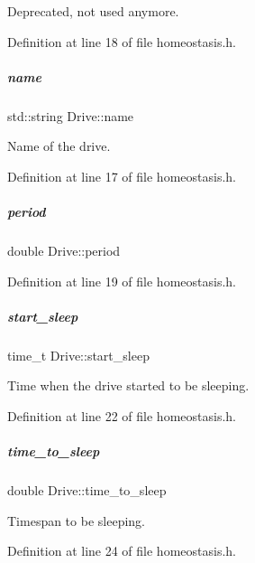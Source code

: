 Deprecated, not used anymore. 



Definition at line 18 of file homeostasis.\+h.

\mbox{\label{group__homeostasis_aacb834e6317eab8a360eeaa10286431d}} 
\subparagraph{\texorpdfstring{name}{name}}
{\footnotesize\ttfamily std\+::string Drive\+::name}



Name of the drive. 



Definition at line 17 of file homeostasis.\+h.

\mbox{\label{group__homeostasis_a371c5d5dac25ea418cb1031b9f4551f3}} 
\subparagraph{\texorpdfstring{period}{period}}
{\footnotesize\ttfamily double Drive\+::period}



Definition at line 19 of file homeostasis.\+h.

\mbox{\label{group__homeostasis_adec23d880897e719e701d6f8a554a88b}} 
\subparagraph{\texorpdfstring{start\+\_\+sleep}{start\_sleep}}
{\footnotesize\ttfamily time\+\_\+t Drive\+::start\+\_\+sleep}



Time when the drive started to be sleeping. 



Definition at line 22 of file homeostasis.\+h.

\mbox{\label{group__homeostasis_a755c6f79b4b5fc2a8be435e03fd76ba4}} 
\subparagraph{\texorpdfstring{time\+\_\+to\+\_\+sleep}{time\_to\_sleep}}
{\footnotesize\ttfamily double Drive\+::time\+\_\+to\+\_\+sleep}



Timespan to be sleeping. 



Definition at line 24 of file homeostasis.\+h.

